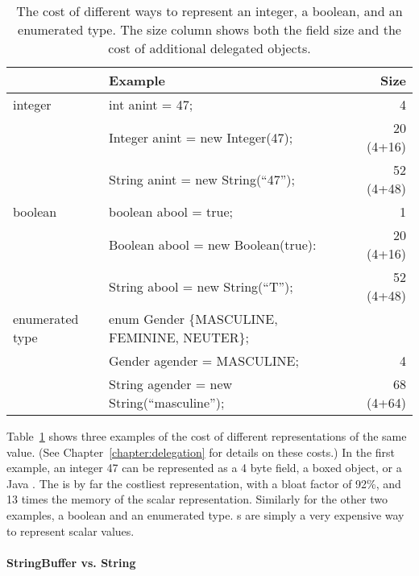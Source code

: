 \begin{table}
  \centering
\begin{tabular}{llr} \toprule \toprule
& Example & Size \\ \midrule \midrule
integer & int anint = 47; & 4 \\
\midrule
& Integer anint = new Integer(47); & 20 (4+16)  \\
\midrule
& String anint = new String(``47''); & 52 (4+48) \\
\midrule
\midrule
boolean & boolean abool = true; & 1\\
\midrule
& Boolean abool = new Boolean(true): & 20 (4+16) \\
\midrule
& String abool = new String(``T''); & 52 (4+48) \\
\midrule \midrule
enumerated type & enum Gender \{MASCULINE, FEMININE, NEUTER\}; &\\
& Gender agender = MASCULINE; & 4 \\
\midrule
& String agender = new String(``masculine''); & 68 (4+64) \\
\bottomrule \bottomrule
\end{tabular}
\caption{The cost of different ways to represent an integer, a boolean, and an
enumerated type. The size column shows both the field size and the cost of
additional delegated objects.}
\label{tab:data-sizes}
\end{table}

Table~\ref{tab:data-sizes} shows three examples of the cost of different
representations of the same value. (See Chapter~\ref{chapter:delegation} for
details on these costs.) In the first example, an integer 47 can be
represented as a 4 byte field, a boxed object, or a Java . 
The  is by far the costliest representation, with a bloat factor of
92\%, and 13 times the memory of the scalar representation.  Similarly for the other two examples, a
boolean and an enumerated type.
s are simply a very expensive way to represent scalar values.

\paragraph{StringBuffer vs. String}

